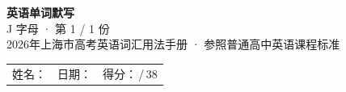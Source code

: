 \documentclass[10pt,a4paper]{article}
\begin{document}
\pagestyle{plain}

\begin{center}
{\LARGE\bfseries 英语单词默写}\\[0.22em]
{\large J 字母 · 第 1 / 1 份}\\[0.18em]
{\small 2026年上海市高考英语词汇用法手册 · 参照普通高中英语课程标准}
\end{center}

\vspace{0.25em}
\noindent\begin{tabular}{@{}p{}@{}p{}@{}p{}@{}}
姓名：\underline{\hspace{2.0cm}} & 日期：\underline{\hspace{2.0cm}} & 得分：\underline{\hspace{1.3cm}}\,/\,38 \\
\end{tabular}

\vspace{0.3em}

\vspace{0.08em}
\end{document}

